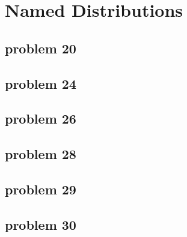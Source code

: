 \section{Named Distributions}

\subsection{problem 20}


\subsection{problem 24}


\subsection{problem 26}


\subsection{problem 28}


\subsection{problem 29}


\subsection{problem 30}
